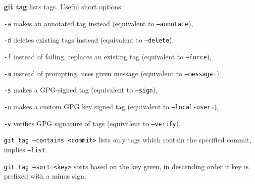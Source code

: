 %

\textbf{git tag} lists tags.
Useful short options:
\begin{compactenum}
\item [\texttt{-a}] makes an annotated tag instead (equivalent to \texttt{--annotate}),
\item [\texttt{-d}] deletes existing tags instead (equivalent to \texttt{--delete}),
\item [\texttt{-f}] instead of failing, replaces an existing tag (equivalent to \texttt{--force}),
\item [\texttt{-m}] instead of prompting, uses given message (equivalent to \texttt{--message=}),
\item [\texttt{-s}] makes a GPG-signed tag (equivalent to \texttt{--sign}),
\item [\texttt{-u}] makes a custom GPG key signed tag (equivalent to \texttt{--local-user=}),
\item [\texttt{-v}] verifies GPG signature of tags (equivalent to \texttt{--verify}).
\end{compactenum}

\texttt{git tag --contains <commit>} lists only tags which contain the specified commit, implies \texttt{--list}.

\texttt{git tag --sort=<key>} sorts based on the key given, in descending order if key is prefixed with a minus sign.

%